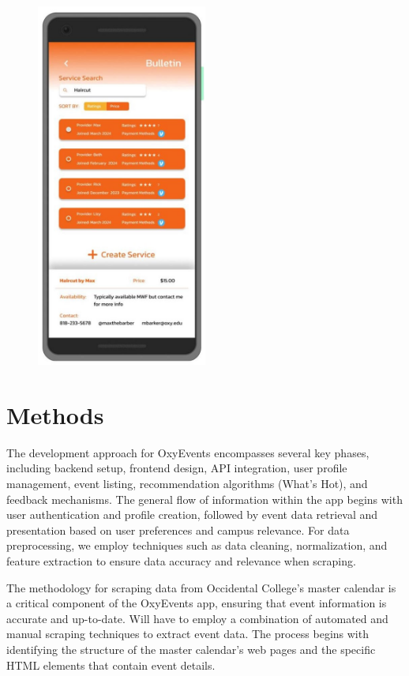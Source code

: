 \documentclass[10pt,twocolumn]{article}
\begin{document}
\begin{figure}[h!]
\includegraphics[width=0.5\textwidth]{images/OxyGo(Bulletin).jpg}
\centering
\end{figure} 

\section{Methods} 
The development approach for OxyEvents encompasses several key phases, including backend setup, frontend design, API integration, user profile management, event listing, recommendation algorithms (What’s Hot), and feedback mechanisms. The general flow of information within the app begins with user authentication and profile creation, followed by event data retrieval and presentation based on user preferences and campus relevance. For data preprocessing, we employ techniques such as data cleaning, normalization, and feature extraction to ensure data accuracy and relevance when scraping. 

The methodology for scraping data from Occidental College’s master calendar is a critical component of the OxyEvents app, ensuring that event information is accurate and up-to-date. Will have to employ a combination of automated and manual scraping techniques to extract event data. The process begins with identifying the structure of the master calendar’s web pages and the specific HTML elements that contain event details. 
\end{document}
